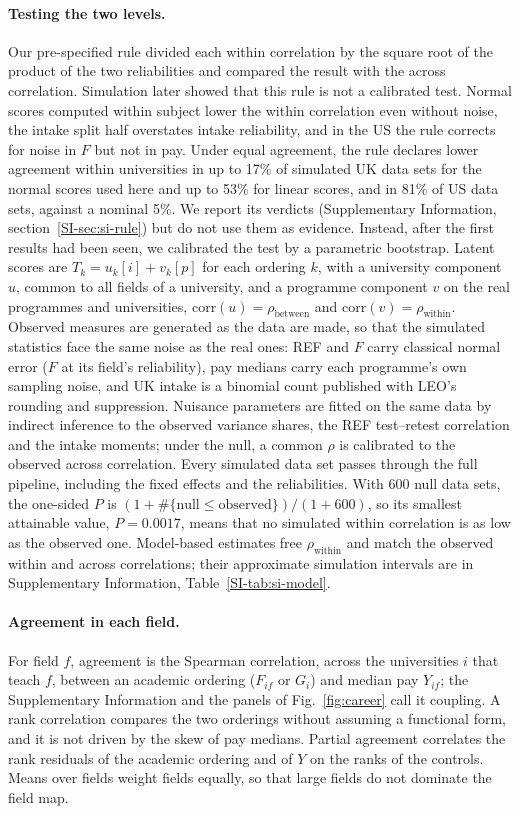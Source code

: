 \documentclass[11pt]{article}
\newcommand{\SIsec}[1]{Supplementary Information, section~\ref{SI-#1}}
\newcommand{\SItab}[1]{Supplementary Information, Table~\ref{SI-#1}}
\begin{document}
\paragraph{Testing the two levels.} Our pre-specified rule divided each within correlation by the square root of the
product of the two reliabilities and compared the result with the across correlation. Simulation later showed that
this rule is not a calibrated test. Normal scores computed within subject lower the within correlation even without
noise, the intake split half overstates intake reliability, and in the US the rule corrects for noise in $F$ but not
in pay. Under equal agreement, the rule declares lower agreement within universities in up to 17\% of simulated UK
data sets for the normal scores used here and up to 53\% for linear scores, and in 81\% of US data sets, against a
nominal 5\%. We report its verdicts (\SIsec{sec:si-rule}) but do not use them as evidence. Instead, after the first
results had been seen, we calibrated the test by a parametric bootstrap. Latent scores are $T_k=u_k[i]+v_k[p]$ for
each ordering $k$, with a university component $u$, common to all fields of a university, and a programme component
$v$ on the real programmes and universities, $\mathrm{corr}(u)=\rho_{\mathrm{between}}$ and
$\mathrm{corr}(v)=\rho_{\mathrm{within}}$. Observed measures are generated as the data are made, so that the simulated
statistics face the same noise as the real ones: REF and $F$ carry classical normal error ($F$ at its field's
reliability), pay medians carry each programme's own sampling noise, and UK intake is a binomial count published with
LEO's rounding and suppression. Nuisance parameters are fitted on the same data by indirect inference to the observed
variance shares, the REF test--retest correlation and the intake moments; under the null, a common $\rho$ is
calibrated to the observed across correlation. Every simulated data set passes through the full pipeline, including
the fixed effects and the reliabilities. With 600 null data sets, the one-sided $P$ is
$(1+\#\{\text{null}\le\text{observed}\})/(1+600)$, so its smallest attainable value, $P=0.0017$, means that no
simulated within correlation is as low as the observed one. Model-based estimates free $\rho_{\mathrm{within}}$ and
match the observed within and across correlations; their approximate simulation intervals are in
\SItab{tab:si-model}.

\paragraph{Agreement in each field.} For field $f$, agreement is the Spearman correlation, across the universities
$i$ that teach $f$, between an academic ordering ($F_{if}$ or $G_i$) and median pay $Y_{if}$; the Supplementary Information
and the panels of Fig.~\ref{fig:career} call it coupling. A rank correlation compares the two orderings
without assuming a functional form, and it is not driven by the skew of pay medians. Partial agreement correlates the
rank residuals of the academic ordering and of $Y$ on the ranks of the controls. Means over fields weight fields
equally, so that large fields do not dominate the field map.
\end{document}
